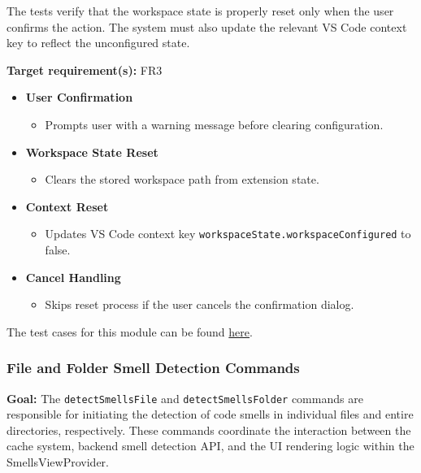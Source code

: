 \documentclass[12pt, titlepage]{article}
\begin{document}
\medskip

\noindent The tests verify that the workspace state is properly reset only when the user confirms the action. The system must also update the relevant VS Code context key to reflect the unconfigured state.

\medskip

\noindent\textbf{Target requirement(s):} FR3~\cite{SRS}

\begin{itemize}
  \item \textbf{User Confirmation}
    \begin{itemize}
      \item Prompts user with a warning message before clearing configuration.
    \end{itemize}

  \item \textbf{Workspace State Reset}
    \begin{itemize}
      \item Clears the stored workspace path from extension state.
    \end{itemize}

  \item \textbf{Context Reset}
    \begin{itemize}
      \item Updates VS Code context key \texttt{workspaceState.workspaceConfigured} to false.
    \end{itemize}

  \item \textbf{Cancel Handling}
    \begin{itemize}
      \item Skips reset process if the user cancels the confirmation dialog.
    \end{itemize}
\end{itemize}

\noindent The test cases for this module can be found
\href{https://github.com/ssm-lab/capstone--sco-vs-code-plugin/blob/plugin-multi-file/test/commands/resetConfiguration.test.ts}{here}.

\subsubsection{File and Folder Smell Detection Commands}

\textbf{Goal:} The \texttt{detectSmellsFile} and \texttt{detectSmellsFolder} commands are responsible for initiating the detection of code smells in individual files and entire directories, respectively. These commands coordinate the interaction between the cache system, backend smell detection API, and the UI rendering logic within the SmellsViewProvider.
\end{document}
